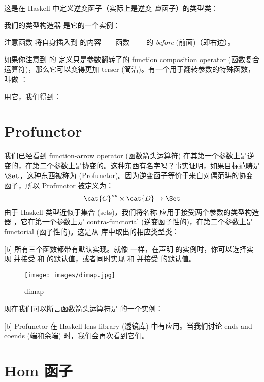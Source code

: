 \noindent
这是在 Haskell 中定义逆变函子（实际上是逆变 \emph{自}函子）的类型类：

我们的类型构造器  是它的一个实例：

注意函数  将自身插入到  的内容——函数 ——的 \emph{before} (前面)（即右边）。

如果你注意到  的  定义只是参数翻转了的 function composition operator (函数复合运算符)，那么它可以变得更加 terser (简洁)。有一个用于翻转参数的特殊函数，叫做 ：

用它，我们得到：


\section{Profunctor}

我们已经看到 function-arrow operator (函数箭头运算符) 在其第一个参数上是逆变的，在第二个参数上是协变的。这种东西有名字吗？事实证明，如果目标范畴是 $\Set$，这种东西被称为  (Profunctor)。因为逆变函子等价于来自对偶范畴的协变函子，所以 Profunctor 被定义为：
\[\cat{C}^\mathit{op} \times \cat{D} \to \Set\]
由于 Haskell 类型近似于集合 (sets)，我们将名称  应用于接受两个参数的类型构造器 ，它在第一个参数上是 contra-functorial (逆变函子性的)，在第二个参数上是 functorial (函子性的)。这是从  库中取出的相应类型类：

[b]
所有三个函数都带有默认实现。就像  一样，在声明  的实例时，你可以选择实现  并接受  和  的默认值，或者同时实现  和  并接受  的默认值。

\begin{figure}[H]
  \centering
  \texttt{[image: images/dimap.jpg]}
  \caption{dimap}
\end{figure}

\noindent
现在我们可以断言函数箭头运算符是  的一个实例：

[b]
Profunctor 在 Haskell lens library (透镜库) 中有应用。当我们讨论 ends and coends (端和余端) 时，我们会再次看到它们。

\section{Hom 函子}

